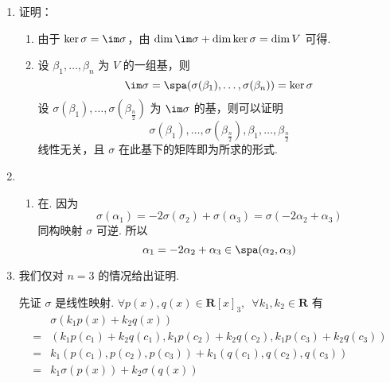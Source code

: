 \begin{enumerate}
    \item 证明：\begin{enumerate}
              \item 由于 $ \ker \sigma = \im \sigma $，由 $ \dim \im \sigma + \dim \ker \sigma = \dim V $ 可得.

              \item 设 $ \beta_1, \ldots, \beta_n $ 为 $ V $ 的一组基，则
                    \[ \im \sigma = \spa(\sigma(\beta_1), \ldots, \sigma(\beta_n)) = \ker \sigma \]
                    设 $ \sigma(\beta_1), \ldots, \sigma(\beta_{\frac{n}{2}}) $ 为 $ \im \sigma $ 的基，则可以证明
                    \[ \sigma(\beta_1), \ldots, \sigma(\beta_{\frac{n}{2}}), \beta_1, \ldots, \beta_{\frac{n}{2}} \]
                    线性无关，且 $ \sigma $ 在此基下的矩阵即为所求的形式.
          \end{enumerate}

    \item \begin{enumerate}
              \item 在. 因为
                    \[ \sigma(\alpha_1) = -2 \sigma(\sigma_2) + \sigma(\alpha_3) = \sigma(-2 \alpha_2 + \alpha_3) \]
                    同构映射 $ \sigma $ 可逆. 所以
                    \[ \alpha_1 = -2 \alpha_2 + \alpha_3 \in \spa(\alpha_2, \alpha_3) \]
          \end{enumerate}

    \item 我们仅对 $ n = 3 $ 的情况给出证明. %

          先证 $ \sigma $ 是线性映射. $ \forall p(x), q(x) \in \mathbf{R}[x]_3,\enspace \forall k_1, k_2 \in \mathbf{R} $ 有
          \begin{align*}
                  & \sigma(k_1 p(x) + k_2 q(x))                                                 \\
              ={} & (k_1 p(c_1) + k_2 q(c_1), k_1 p(c_2) + k_2 q(c_2), k_1 p(c_3) + k_2 q(c_3)) \\
              ={} & k_1(p(c_1), p(c_2), p(c_3)) + k_1(q(c_1), q(c_2), q(c_3))                   \\
              ={} & k_1 \sigma(p(x)) + k_2 \sigma(q(x))
          \end{align*}


\end{enumerate}
